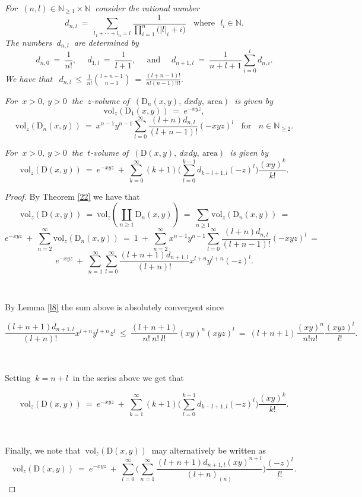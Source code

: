 \documentclass[10pt,a4paper]{amsart}
\begin{document}
\begin{lem}\label{l8}
{\em For $ \  (n,l) \in \mathbb{N}_{\geq 1}\times \mathbb{N} \ $ consider  the  rational number
$$d_{n,l} \ = \ \sum_{l_1+\cdots+l_n=l}
 \frac{1}{\prod_{i=1}^{n}\big(|l|_i+i\big)} \ \ \ \ \mbox{where} \ \ \ l_i\in \mathbb{N}.$$
The numbers $\ d_{n,l} \ $ are determined by 
$$d_{n,0}\ = \ \frac{1}{n!}, \   \ \ \ \ \  d_{1,l}\ = \ \frac{1}{l+1}, \ \ \ \ \ \  \mbox{and}\ \  \ \ \ \
d_{n+1,l}\ = \ \frac{1}{n+l+1}\sum_{i=0}^{l}d_{n,i} .$$ 
We have that
$\ \ \displaystyle d_{n,l} \ \leq \  \frac{1}{n!}\binom{l+n-1}{n-1} \ = \ 
\frac{(l+n-1)!}{n!(n-1)!l!}.$
}
\end{lem}

\begin{thm}\label{22}
{\em For $\ x>0,\ y>0 \ $ the $\ z$-volume 
  of  $\ (\mathrm{D}_n(x,y),\ dxdy,\ \mathrm{area}) \ $ is given by $$\ \mathrm{vol}_{z}(\mathrm{D}_1(x,y)) \ = \ e^{-xyz}, \ $$ $$ \mathrm{vol}_z(\mathrm{D}_n(x,y)) \ = \
  x^{n-1}y^{n-1}\sum_{l=0}^{\infty} \frac{(l+n)d_{n,l}}{(l+n-1)!} (-xyz)^l 
  \ \ \ \ \mbox{for} \ \ \ \ n \in \mathbb{N}_{\geq 2}.$$
}  
\end{thm}

\begin{thm}
{\em For $\ x>0,\ y>0 \ $ the $\ t$-volume 
 of  $\ (\mathrm{D}(x,y),\ dxdy,\ \mathrm{area}) \ $ is given by
$$ \mathrm{vol}_{z}(\mathrm{D}(x,y))  \ = \ e^{-xyz} \ + \ \sum_{k=0}^{\infty}(k+1)\bigg(\sum_{l=0}^{k-1} d_{k-l+1,l} (-z)^l\bigg)\frac{(xy)^{k}}{k!}.$$
}  
\end{thm}

\begin{proof} By Theorem \ref{22} we have that
$$ \ \mathrm{vol}_z(\mathrm{D}(x,y)) \ = \  
\mathrm{vol}_z(\coprod_{n\geq 1}\mathrm{D}_n(x,y)) \ = \ 
 \sum_{n\geq 1}\mathrm{vol}_z(\mathrm{D}_n(x,y))
 \ = $$ 
 $$e^{-xyz} \ + \ \sum_{n=2}^{\infty}\mathrm{vol}_z(\mathrm{D}_n(x,y))\ = \
1 \ + \ \sum_{n=2}^{\infty}x^{n-1}y^{n-1}\sum_{l=0}^{\infty} \frac{(l+n)d_{n,l}}{(l+n-1)!} (-xyz)^l \ = $$
$$e^{-xyz} \ + \ \sum_{n=1}^{\infty}\sum_{l=0}^{\infty} \frac{(l+n+1)d_{n+1,l}}{(l+n)!}  x^{l+n}y^{l+n}(-z)^l.$$

\

\noindent  By Lemma \ref{l8} the sum above is absolutely convergent since

$$\frac{(l+n+1)d_{n+1,l}}{(l+n)!}x^{l+n}y^{l+n}z^l
\ \leq \ \frac{(l+n+1)}{n!\ n! \ l!} 
 (xy)^{n}(xyz)^l \ = \ (l+n+1)
 \frac{(xy)^{n}}{n! n!}\frac{(xyz)^l}{l!}.$$

\



\noindent Setting $\ k=n+l \ $ in the series above we get that 

$$ \mathrm{vol}_z(\mathrm{D}(x,y)) \ = \  e^{-xyz} \ + \ \sum_{k=1}^{\infty}(k+1)\bigg(\sum_{l=0}^{k-1} d_{k-l+1,l}(-z)^l \bigg)\frac{(xy)^{k}}{k!}. $$

\

\noindent Finally, we note  that $ \ \mathrm{vol}_z(\mathrm{D}(x,y)) \ $ may alternatively be written as 
$$\mathrm{vol}_z(\mathrm{D}(x,y)) \ = \  e^{-xyz} \ + \ 
\sum_{l=0}^{\infty} \bigg( \sum_{n=1}^{\infty}
\frac{(l+n+1)d_{n+1,l}(xy)^{n+l}}{(l+n)_{(n)}}\bigg)\frac{(-z)^l}{ l!} .$$

\end{proof}
\end{document}
